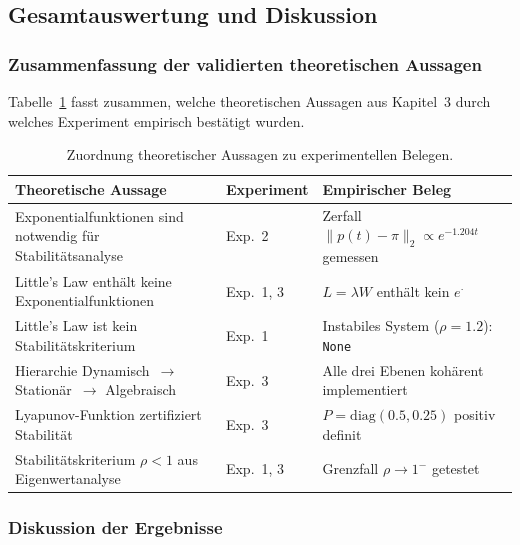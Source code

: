 ﻿\documentclass[a4paper,12pt]{scrreprt}
\theoremstyle{definition}
\begin{document}
\subsection{Gesamtauswertung und Diskussion}
\label{subsec:diskussion}

\subsubsection{Zusammenfassung der validierten theoretischen Aussagen}
\label{subsubsec:validierungen}

Tabelle~\ref{tab:validierungen} fasst zusammen, welche theoretischen
Aussagen aus Kapitel~3 durch welches Experiment empirisch bestätigt
wurden.

\begin{table}[H]
	\centering
	\renewcommand{\arraystretch}{1.25}
	\begin{tabular}{@{}p{5.5cm}lp{4.5cm}@{}}
		\toprule
		\textbf{Theoretische Aussage} &
		\textbf{Experiment} &
		\textbf{Empirischer Beleg} \\
		\midrule
		Exponentialfunktionen sind notwendig für Stabilitätsanalyse &
		Exp.~2 &
		Zerfall $\|p(t)-\pi\|_2 \propto e^{-1.204t}$ gemessen \\
		
		Little's Law enthält keine Exponentialfunktionen &
		Exp.~1, 3 &
		$L = \lambda W$ enthält kein $e^{\cdot}$ \\
		
		Little's Law ist kein Stabilitätskriterium &
		Exp.~1 &
		Instabiles System ($\rho=1.2$): \texttt{None} \\
		
		Hierarchie Dynamisch~$\to$ Stationär~$\to$ Algebraisch &
		Exp.~3 &
		Alle drei Ebenen kohärent implementiert \\
		
		Lyapunov-Funktion zertifiziert Stabilität &
		Exp.~3 &
		$P = \text{diag}(0.5, 0.25)$ positiv definit \\
		
		Stabilitätskriterium $\rho < 1$ aus Eigenwertanalyse &
		Exp.~1, 3 &
		Grenzfall $\rho \to 1^-$ getestet \\
		\bottomrule
	\end{tabular}
	\caption{Zuordnung theoretischer Aussagen zu experimentellen Belegen.}
	\label{tab:validierungen}
\end{table}

\subsubsection{Diskussion der Ergebnisse}
\label{subsubsec:ergebnisse-diskussion}
\end{document}
